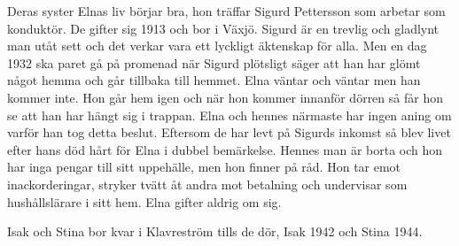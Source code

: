 Deras syster Elnas liv börjar bra, hon träffar Sigurd Pettersson som arbetar som konduktör. De gifter sig 1913 och bor i Växjö. Sigurd är en trevlig och gladlynt man utåt sett och det verkar vara ett lyckligt äktenskap för alla. Men en dag 1932 ska paret gå på promenad när Sigurd plötsligt säger att han har glömt något hemma och går tillbaka till hemmet. Elna väntar och väntar men han kommer inte. Hon går hem igen och när hon kommer innanför dörren så får hon se att han har hängt sig i trappan. Elna och hennes närmaste har ingen aning om varför han tog detta beslut.
Eftersom de har levt på Sigurds inkomst så blev livet efter hans död hårt för Elna i dubbel bemärkelse. Hennes man är borta och hon har inga pengar till sitt uppehälle, men hon finner på råd. Hon tar emot inackorderingar, stryker tvätt åt andra mot betalning och undervisar som hushållslärare i sitt hem. Elna gifter aldrig om sig.

Isak och Stina bor kvar i Klavreström tills de dör, Isak 1942 och Stina 1944.

